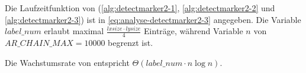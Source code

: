 Die Laufzeitfunktion von  (\autoref{alg:detectmarker2-1}, \autoref{alg:detectmarker2-2} und
 \autoref{alg:detectmarker2-3}) ist in \autoref{eq:analyse-detectmarker2-3} angegeben. Die Variable
 $\mathit{label\_num}$ erlaubt maximal $\tfrac{\mathit{lxsize}\cdot\mathit{lysize}}{4}$ Einträge, während Variable $n$
 von $\mathit{AR\_CHAIN\_MAX} = 10000$ begrenzt ist.

Die Wachstumsrate von  entspricht $\Theta(\mathit{label\_num}\cdot n \log n)$.

% 
% 
% 
% 
% 
% 
% 
